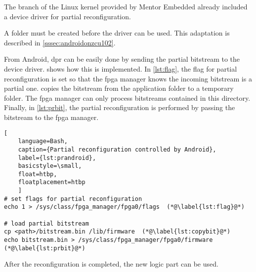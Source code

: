The branch of the Linux kernel provided by Mentor Embedded \cite{linuxkernel} already included a device driver for partial reconfiguration.

A folder must be created before the driver can be used. This adaptation is described in \cref{sssec:androidonzcu102}. 

From Android, \gls{dpr} can be easily done by sending the partial bitstream to the device driver.  shows how this is implemented.
In \cref{lst:flag}, the flag for partial reconfiguration is set so that the \gls{fpga} manager knows the incoming bitstream is a partial one.  copies the bitstream from the application folder to a temporary folder. The \gls{fpga} manager can only process bitstreams contained in this directory. Finally, in \cref{lst:prbit}, the partial reconfiguration is performed by passing the bitstream to the \gls{fpga} manager.

\begin{lstlisting}[
    language=Bash,
    caption={Partial reconfiguration controlled by Android},
    label={lst:prandroid},
    basicstyle=\small,
    float=htbp,
    floatplacement=htbp
    ]
# set flags for partial reconfiguration
echo 1 > /sys/class/fpga_manager/fpga0/flags  (*@\label{lst:flag}@*)

# load partial bitstream
cp <path>/bitstream.bin /lib/firmware  (*@\label{lst:copybit}@*)
echo bitstream.bin > /sys/class/fpga_manager/fpga0/firmware  (*@\label{lst:prbit}@*)
\end{lstlisting}

After the reconfiguration is completed, the new logic part can be used.